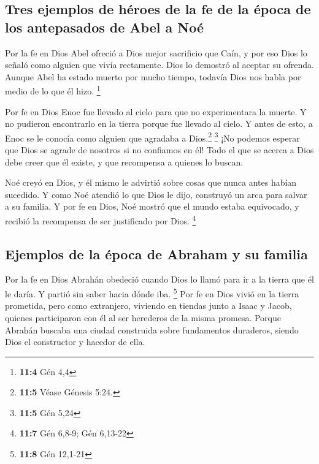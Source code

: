 \hypertarget{tres-ejemplos-de-huxe9roes-de-la-fe-de-la-uxe9poca-de-los-antepasados-de-abel-a-nouxe9}{%
\subsection{Tres ejemplos de héroes de la fe de la época de los
antepasados \hspace{0pt}\hspace{0pt}de Abel a
Noé}\label{tres-ejemplos-de-huxe9roes-de-la-fe-de-la-uxe9poca-de-los-antepasados-de-abel-a-nouxe9}}

 Por la fe en Dios Abel ofreció a Dios mejor sacrificio
que Caín, y por eso Dios lo señaló como alguien que vivía rectamente.
Dios lo demostró al aceptar su ofrenda. Aunque Abel ha estado muerto por
mucho tiempo, todavía Dios nos habla por medio de lo que él hizo.
\footnote{\textbf{11:4} Gén 4,4}

 Por fe en Dios Enoc fue llevado al cielo para que no
experimentara la muerte. Y no pudieron encontrarlo en la tierra porque
fue llevado al cielo. Y antes de esto, a Enoc se le conocía como alguien
que agradaba a Dios.\footnote{\textbf{11:5} Véase Génesis 5:24.}
\footnote{\textbf{11:5} Gén 5,24}  ¡No podemos esperar que
Dios se agrade de nosotros si no confiamos en él! Todo el que se acerca
a Dios debe creer que él existe, y que recompensa a quienes lo buscan.

 Noé creyó en Dios, y él mismo le advirtió sobre cosas que
nunca antes habían sucedido. Y como Noé atendió lo que Dios le dijo,
construyó un arca para salvar a su familia. Y por fe en Dios, Noé mostró
que el mundo estaba equivocado, y recibió la recompensa de ser
justificado por Dios. \footnote{\textbf{11:7} Gén 6,8-9; Gén 6,13-22}

\hypertarget{ejemplos-de-la-uxe9poca-de-abraham-y-su-familia}{%
\subsection{Ejemplos de la época de Abraham y su
familia}\label{ejemplos-de-la-uxe9poca-de-abraham-y-su-familia}}

 Por la fe en Dios Abrahán obedeció cuando Dios lo llamó
para ir a la tierra que él le daría. Y partió sin saber hacia dónde iba.
\footnote{\textbf{11:8} Gén 12,1-21}  Por fe en Dios vivió
en la tierra prometida, pero como extranjero, viviendo en tiendas junto
a Isaac y Jacob, quienes participaron con él al ser herederos de la
misma promesa.  Porque Abrahán buscaba una ciudad
construida sobre fundamentos duraderos, siendo Dios el constructor y
hacedor de ella.

